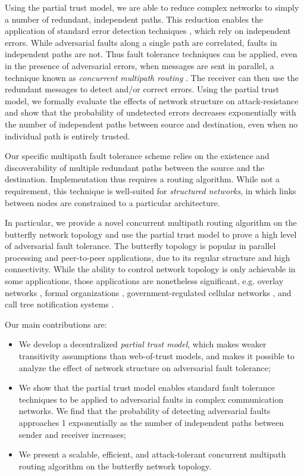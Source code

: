 \documentclass{sig-alternate-05-2015}
\begin{document}
Using the partial trust model, we are able to reduce complex networks to
simply a number of redundant, independent paths.
This reduction enables the application of standard error detection techniques
\cite{avizienis_basic_2004, von_neumann_probabilistic_1956},
which rely on independent errors.
While adversarial faults along a single path are correlated,
faults in independent paths are not.
Thus fault tolerance techniques can be applied,
even in the presence of adversarial errors,
when messages are sent in parallel,
a technique known as {\em concurrent multipath routing}
\cite{zin_survey_2015, qadir_exploiting_2015, khiani_comparative_2013}.
The receiver can then use the redundant messages to detect and/or correct
errors.
Using the partial trust model, we formally evaluate the 
effects of network structure on attack-resistance and show that the probability
of undetected errors decreases exponentially with the number of
independent paths between source and destination,
even when no individual path is entirely trusted.

Our specific multipath fault tolerance scheme relies on the existence
and discoverability of multiple redundant paths between the source and
the destination.
Implementation thus requires a routing algorithm.
While not a requirement, this technique is well-suited for
{\em structured networks},
in which links between nodes are constrained to a particular architecture.

In particular, we provide a novel concurrent multipath routing algorithm
on the butterfly network topology and use the partial trust model to prove
a high level of adversarial fault tolerance.
The butterfly topology is popular in parallel processing
\cite{kshemkalyani_distributed_2008} and
peer-to-peer \cite{lua_survey_2005, korzun_structured_2013}
applications, due to its regular structure and high connectivity.
While the ability to control network topology is only achievable in some
applications, those applications are nonetheless significant,
e.g. overlay networks \cite{lua_survey_2005, korzun_structured_2013},
formal organizations \cite{mohr_explaining_1982},
government-regulated cellular networks \cite{walker_mass_2012},
and call tree notification systems \cite{nickerson_thinking_2010}.

Our main contributions are:
\begin{itemize}
\item{We develop a decentralized {\em partial trust model},
which makes weaker transitivity assumptions than web-of-trust models,
and makes it possible to analyze the effect of network structure on
adversarial fault tolerance;}
\item{We show that the partial trust model enables standard fault
tolerance techniques to be applied to adversarial faults in
complex communication networks.
We find that the probability of detecting adversarial faults
approaches 1 exponentially as the number of independent paths between
sender and receiver increases;}
\item{We present a scalable, efficient, and attack-tolerant concurrent
multipath routing algorithm on the butterfly network topology.}
\end{itemize}
\end{document}
